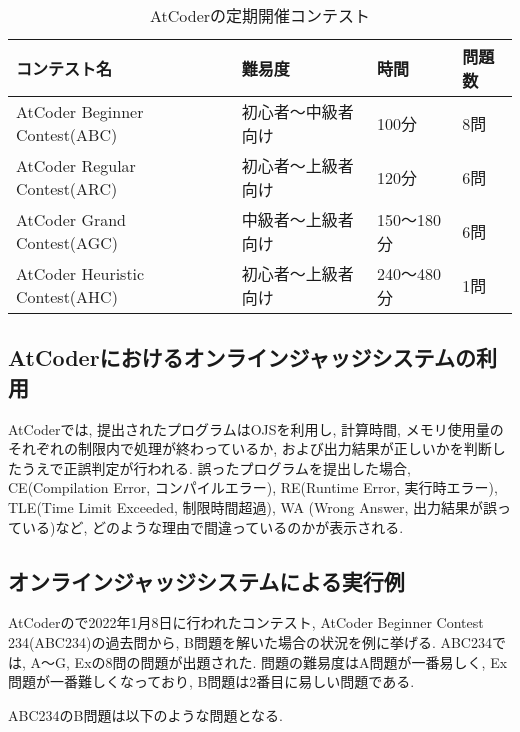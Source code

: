 \begin{table}[H]
    \caption{AtCoderの定期開催コンテスト}
    \label{tab:atcoder contest}
    \centering

    \begin{tabular}{|l||l|l|l|}
        \hline
        コンテスト名 & 難易度 & 時間 & 問題数 \\ \hline
        \hline
        AtCoder Beginner Contest(ABC) & 初心者～中級者向け & 100分 & 8問 \\ \hline
        AtCoder Regular Contest(ARC) & 初心者～上級者向け & 120分 & 6問 \\ \hline
        AtCoder Grand Contest(AGC) & 中級者～上級者向け & 150～180分 & 6問 \\ \hline
        AtCoder Heuristic Contest(AHC) & 初心者～上級者向け & 240～480分 & 1問 \\ \hline
        
    \end{tabular}

\end{table}

\subsection{AtCoderにおけるオンラインジャッジシステムの利用}

AtCoderでは, 提出されたプログラムはOJSを利用し, 計算時間, メモリ使用量のそれぞれの制限内で処理が終わっているか, および出力結果が正しいかを判断したうえで正誤判定が行われる. 
誤ったプログラムを提出した場合, CE(Compilation Error, コンパイルエラー), RE(Runtime Error, 実行時エラー), TLE(Time Limit Exceeded, 制限時間超過), WA (Wrong Answer, 出力結果が誤っている)など, どのような理由で間違っているのかが表示される. 

\clearpage

\subsection{オンラインジャッジシステムによる実行例}

AtCoderので2022年1月8日に行われたコンテスト, AtCoder Beginner Contest 234(ABC234)の過去問から, B問題を解いた場合の状況を例に挙げる. 
ABC234では, A～G, Exの8問の問題が出題された. 
問題の難易度はA問題が一番易しく, Ex問題が一番難しくなっており, B問題は2番目に易しい問題である. 

ABC234のB問題は以下のような問題となる. 

